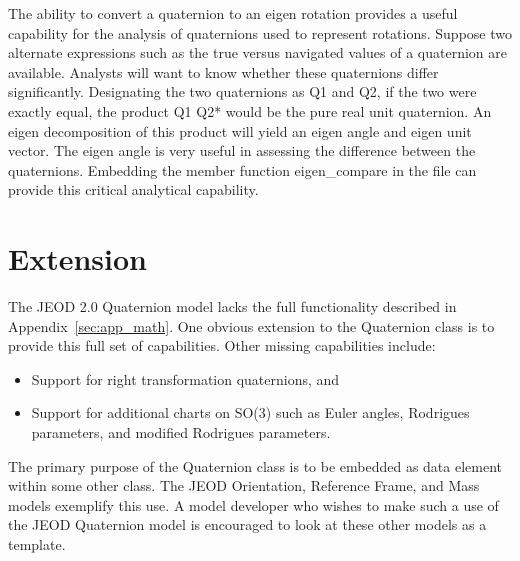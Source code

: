 The ability to convert a quaternion to an eigen rotation provides a  
useful capability for the analysis of quaternions used to represent  
rotations. Suppose two alternate expressions such as the true versus  
navigated values of a quaternion are available. Analysts will want to  
know whether these quaternions differ significantly. Designating the  
two quaternions as Q1 and Q2, if the two were exactly equal, the  
product Q1 Q2* would be the pure real unit quaternion. An eigen  
decomposition of this product will yield an eigen angle and eigen unit  
vector. The eigen angle is very useful in assessing the difference  
between the quaternions. Embedding the member function eigen\_compare in the
\Sdefine file can provide this critical analytical capability.


\section{Extension}

The JEOD 2.0 Quaternion model lacks the full functionality described
in Appendix~\ref{sec:app_math}. One obvious extension
to the Quaternion class is to provide this full set of capabilities.
Other missing capabilities include:
\begin{itemize}
\item Support for right transformation quaternions, and
\item Support for additional charts on SO(3) such as 
Euler angles, Rodrigues parameters, and modified Rodrigues parameters.
\end{itemize}

The primary purpose of the Quaternion class is to be embedded as data
element within some other class. The JEOD Orientation, Reference Frame,
and Mass models exemplify this use. A model developer who wishes to
make such a use of the JEOD Quaternion model is encouraged to look
at these other models as a template.

